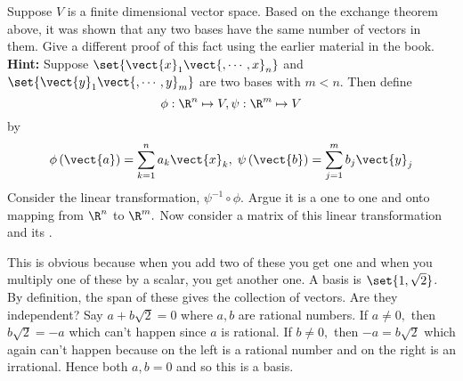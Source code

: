 \begin{enumialphparenastyle}
\begin{ex} Suppose $V$ is a finite dimensional vector space. Based on the
exchange theorem above, it was shown that any two bases have the same number
of vectors in them. Give a different proof of this fact using the earlier
material in the book. \textbf{Hint: }Suppose $\set{\vect{x}_{1}\vect{
,\cdots ,x}_{n}} $ and $\set{\vect{y}_{1}\vect{,\cdots ,y}
_{m}} $ are two bases with $m<n.$ Then define 
\begin{equation*}
\phi :\R^{n}\mapsto V,\psi :\R^{m}\mapsto V
\end{equation*}
by 
\begin{equation*}
\phi \left( \vect{a}\right) = \sum_{k=1}^{n}a_{k}\vect{x}
_{k},\;\psi \left( \vect{b}\right) = \sum_{j=1}^{m}b_{j}\vect{y}_{j}
\end{equation*}
Consider the linear transformation, $\psi ^{-1}\circ \phi .$ Argue it is a
one to one and onto mapping from $\R^{n}$ to $\R^{m}.$ Now
consider a matrix of this linear transformation and its {\rref}.
\begin{sol}
This is obvious because
when you add two of these you get one and when you multiply one of these by
a scalar, you get another one. A basis is $\set{1,\sqrt{2}} $. By
definition, the span of these gives the collection of vectors. Are they
independent? Say $a+b\sqrt{2}=0$ where $a,b$ are rational numbers. If $a\neq
0,$ then $b\sqrt{2}=-a$ which can't happen since $a$ is rational. If $b\neq
0,$ then $-a=b\sqrt{2}$ which again can't happen because on the left is a
rational number and on the right is an irrational. Hence both $a,b=0$ and so
this is a basis.
\end{sol}
\end{ex}

\end{enumialphparenastyle}
